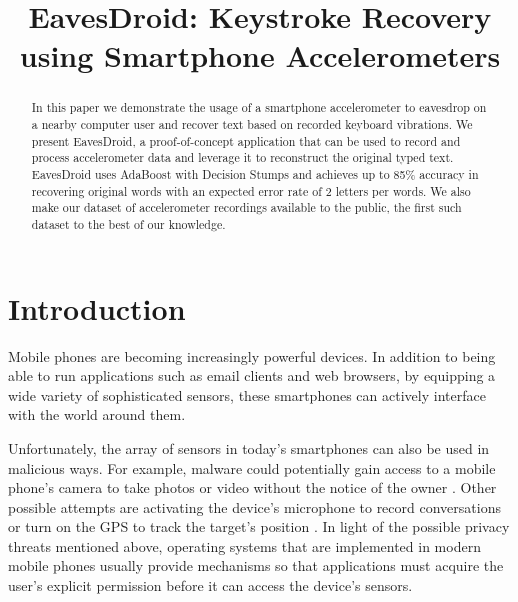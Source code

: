 \documentclass[11pt,conference]{IEEEtran}
\begin{document}
\title{EavesDroid: Keystroke Recovery using Smartphone Accelerometers}

\author{
}

\maketitle

\begin{abstract}

In this paper we demonstrate the usage of a smartphone accelerometer to eavesdrop on a nearby computer user and recover text based on recorded keyboard vibrations.
 We present EavesDroid, a proof-of-concept application that can be used to record and process accelerometer data and leverage it to reconstruct the original typed text. EavesDroid
uses AdaBoost with Decision Stumps and achieves up to 85\% accuracy in recovering original words with an expected error rate of 2 letters per words.
We also make our dataset of accelerometer recordings available to the public, the first such dataset to the best of our knowledge. 

\end{abstract}
\IEEEpeerreviewmaketitle

\section{Introduction}
\label{sec:introduction}
Mobile phones are becoming increasingly powerful
devices. In addition to being able to run applications such as email clients and web browsers, by equipping a wide variety of sophisticated sensors, these smartphones can actively interface with the world around them.

Unfortunately, the array of sensors in today's smartphones can also be
used in malicious ways. For example, malware could
potentially gain access to a mobile phone's camera to take photos or
video without the notice of the owner \cite{cheng2007mobile}. Other possible attempts are activating the device's microphone to record conversations or turn on the GPS to track the target's position
\cite{dagon2004mobile, cai2009defending, enck2010taintdroid, egele2011pios}.
In light of the possible privacy threats mentioned above, operating systems that are implemented in modern mobile phones usually provide mechanisms so that applications must acquire the user's explicit permission before it can access the device's sensors.
\end{document}
